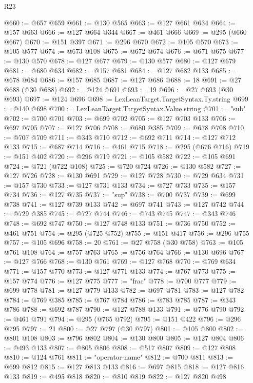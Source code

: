 \begin{lexlean}{R23}
\begin{coremodule}
@660 := @657 @659
@661 := @130 @565
@663 := @127 @661 @634
@664 := @157 @663
@666 := @127 @664 @344
@667 := @461 @666
@669 := @295 (@660 @667)
@670 := @151 @397
@671 := @296 @670
@672 := @105 @570
@673 := @105 @577
@674 := @673 @108
@675 := @672 @674
@676 := @671 @675
@677 := @130 @570
@678 := @127 @677
@679 := @130 @577
@680 := @127 @679
@681 := @680 @634
@682 := @157 @681
@684 := @127 @682 @133
@685 := @678 @684
@686 := @157 @685
@687 := @127 @686
@688 := 18
@691 := @27 @688 (@30 @688)
@692 := @124 @691
@693 := 19
@696 := @27 @693 (@30 @693)
@697 := @124 @696
@698 := LexLeanTarget.TargetSyntax.Ty.string
@699 := @140 @698
@700 := LexLeanTarget.TargetSyntax.Value.string
@701 := "sub"
@702 := @700 @701
@703 := @699 @702
@705 := @127 @703 @133
@706 := @697 @705
@707 := @127 @706
@708 := @680 @385
@709 := @678 @708
@710 := @707 @709
@711 := @343 @710
@712 := @692 @711
@714 := @127 @712 @133
@715 := @687 @714
@716 := @461 @715
@718 := @295 (@676 @716)
@719 := @151 @402
@720 := @296 @719
@721 := @105 @582
@722 := @105 @691
@724 := @721 (@722 @108)
@725 := @720 @724
@726 := @130 @582
@727 := @127 @726
@728 := @130 @691
@729 := @127 @728
@730 := @729 @634
@731 := @157 @730
@733 := @127 @731 @133
@734 := @727 @733
@735 := @157 @734
@736 := @127 @735
@737 := "sup"
@738 := @700 @737
@739 := @699 @738
@741 := @127 @739 @133
@742 := @697 @741
@743 := @127 @742
@744 := @729 @385
@745 := @727 @744
@746 := @743 @745
@747 := @343 @746
@748 := @692 @747
@750 := @127 @748 @133
@751 := @736 @750
@752 := @461 @751
@754 := @295 (@725 @752)
@755 := @151 @417
@756 := @296 @755
@757 := @105 @696
@758 := 20
@761 := @27 @758 (@30 @758)
@763 := @105 @761 @108
@764 := @757 @763
@765 := @756 @764
@766 := @130 @696
@767 := @127 @766
@768 := @130 @761
@769 := @127 @768
@770 := @769 @634
@771 := @157 @770
@773 := @127 @771 @133
@774 := @767 @773
@775 := @157 @774
@776 := @127 @775
@777 := "frac"
@778 := @700 @777
@779 := @699 @778
@781 := @127 @779 @133
@782 := @697 @781
@783 := @127 @782
@784 := @769 @385
@785 := @767 @784
@786 := @783 @785
@787 := @343 @786
@788 := @692 @787
@790 := @127 @788 @133
@791 := @776 @790
@792 := @461 @791
@794 := @295 (@765 @792)
@795 := @151 @422
@796 := @296 @795
@797 := 21
@800 := @27 @797 (@30 @797)
@801 := @105 @800
@802 := @801 @108
@803 := @796 @802
@804 := @130 @800
@805 := @127 @804
@806 := @493 @133
@807 := @805 @806
@808 := @517 @807
@809 := @127 @808
@810 := @124 @761
@811 := "operator-name"
@812 := @700 @811
@813 := @699 @812
@815 := @127 @813 @133
@816 := @697 @815
@818 := @127 @816 @133
@819 := @495 @818
@820 := @810 @819
@822 := @127 @820 @498

\end{coremodule}
\end{lexlean}
